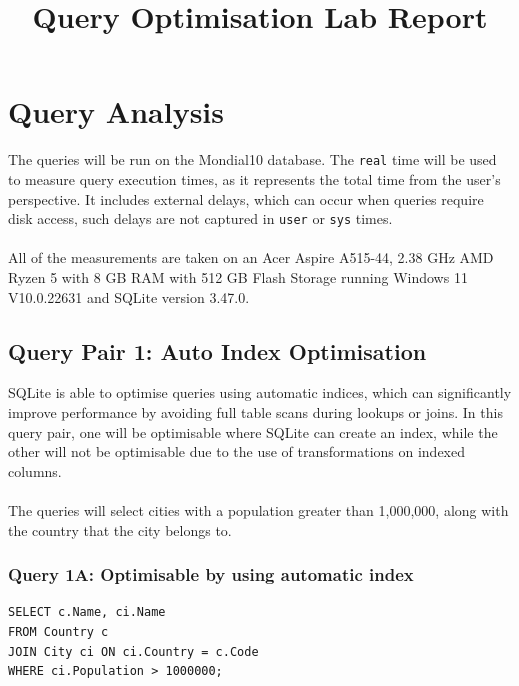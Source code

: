 \documentclass[11pt]{article}
\begin{document}
\title{\LARGE{\textbf{Query Optimisation Lab Report}}\vspace{-2em}}
\date{}
\maketitle



\setlength{\parindent}{0pt}
\section{Query Analysis}

The queries will be run on the Mondial10 database. The \texttt{real} time will be used to measure query execution times, as it represents
the total time from the user's perspective. It includes external delays, which can occur when queries require disk access, such delays
are not captured in \texttt{user} or \texttt{sys} times.
\\ \\ 
All of the measurements are taken on an Acer Aspire A515-44, 2.38 GHz AMD Ryzen 5 with 8 GB RAM with 512 GB Flash Storage running Windows 11
V10.0.22631 and SQLite version 3.47.0.


\subsection{Query Pair 1: Auto Index Optimisation}

SQLite is able to optimise queries using automatic indices, which can significantly improve performance by avoiding full
table scans during lookups or joins. In this query pair, one will be optimisable where SQLite can create an index,
while the other will not be optimisable due to the use of transformations on indexed columns.
\\ \\
The queries will select cities with a population greater than 1,000,000, along with the country that the city belongs to.

\subsubsection{Query 1A: Optimisable by using automatic index}

\begin{verbatim}
SELECT c.Name, ci.Name
FROM Country c
JOIN City ci ON ci.Country = c.Code
WHERE ci.Population > 1000000;
\end{verbatim}
\end{document}
